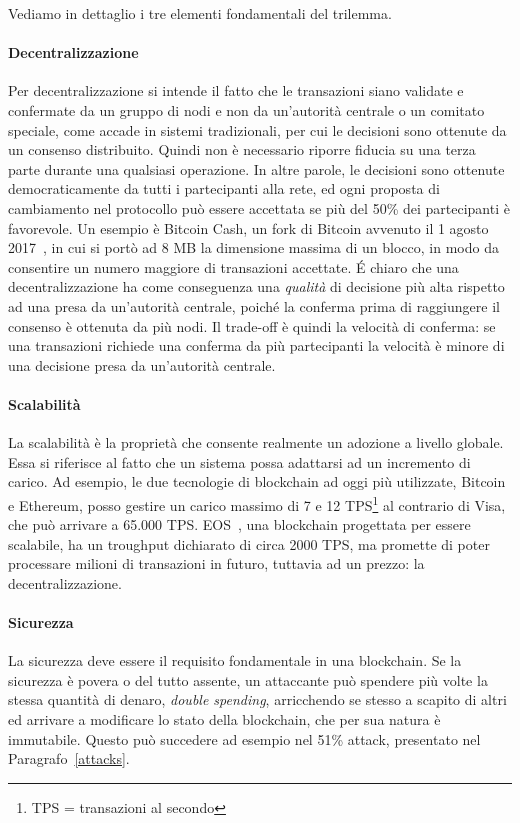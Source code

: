 Vediamo in dettaglio i tre elementi fondamentali del trilemma.

\paragraph{Decentralizzazione}
Per decentralizzazione si intende il fatto che le transazioni siano validate e confermate da un gruppo di nodi e non da un'autorità centrale o un comitato speciale, come accade in sistemi tradizionali, per cui le decisioni sono ottenute da un consenso distribuito. Quindi non è necessario riporre fiducia su una terza parte durante una qualsiasi operazione. In altre parole, le decisioni sono ottenute democraticamente da tutti i partecipanti alla rete, ed ogni proposta di cambiamento nel protocollo può essere accettata se più del 50\% dei partecipanti è favorevole. Un esempio è Bitcoin Cash, un fork di Bitcoin avvenuto il 1 agosto 2017~\cite{bcash}, in cui si portò ad 8 MB la dimensione massima di un blocco, in modo da consentire un numero maggiore di transazioni accettate.
\'E chiaro che una decentralizzazione ha come conseguenza una \emph{qualità} di decisione più alta rispetto ad una presa da un'autorità centrale, poiché la conferma prima di raggiungere il consenso è ottenuta da più nodi. Il trade-off è quindi la velocità di conferma: se una transazioni richiede una conferma da più partecipanti la velocità è minore di una decisione presa da un'autorità centrale.

\paragraph{Scalabilità}
La scalabilità è la proprietà che consente realmente un adozione a livello globale. Essa si riferisce al fatto che un sistema possa adattarsi ad un incremento di carico. Ad esempio, le due tecnologie di blockchain ad oggi più utilizzate, Bitcoin e Ethereum, posso gestire un carico massimo di 7 e 12 TPS\footnote{TPS = transazioni al secondo}
al contrario di Visa, che può arrivare a 65.000 TPS. EOS~\cite{xu2018eos}, una blockchain progettata per essere scalabile, ha un troughput dichiarato di circa 2000 TPS, ma promette di poter processare milioni di transazioni in futuro, tuttavia ad un prezzo: la decentralizzazione.

\paragraph{Sicurezza}
La sicurezza deve essere il requisito fondamentale in una blockchain. Se la sicurezza è povera o del tutto assente, un attaccante può spendere più volte la stessa quantità di denaro, \emph{double spending}, arricchendo se stesso a scapito di altri ed arrivare a modificare lo stato della blockchain, che per sua natura è immutabile. Questo può succedere ad esempio nel 51\% attack, presentato nel Paragrafo~\ref{attacks}.

